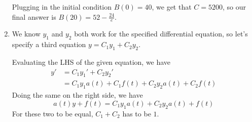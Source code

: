 \documentclass[12pt]{article}
\begin{document}
\begin{enumerate}
          Plugging in the initial condition $B(0)=40$, we get that $C=5200$,
          so our final answer is $B(20)=\boxed{52-\frac{24}{e}}$.

    \item We know $y_1$ and $y_2$ both work for the specified differential equation,
          so let's specify a third equation $y=C_1y_1+C_2y_2$.

          Evaluating the LHS of the given equation, we have
          \begin{align*}
              y' & =C_1y_1'+C_2y_2'                       \\
                 & =C_1y_1a(t)+C_1f(t)+C_2y_2a(t)+C_2f(t)
          \end{align*}
          Doing the same on the right side, we have
          \[a(t)y+f(t) = C_1y_1a(t)+C_2y_2a(t)+f(t)\]
          For these two to be equal, $C_1+C_2$ has to be $1$.
\end{enumerate}
\end{document}
